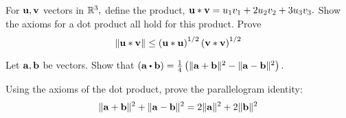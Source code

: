 \begin{enumialphparenastyle}
\begin{ex} For ${\bf u},{\bf v}$ vectors in $\mathbb{R}^{3},$ define the product, 
${\bf u}\ast {\bf v} =  u_{1}v_{1}+2u_{2}v_{2}+3u_{3}v_{3}.$ Show the axioms
for a dot product all hold for this product. Prove
\begin{equation*}
\| {\bf u}\ast {\bf v}\| \leq \left( {\bf u}\ast {\bf u}\right)
^{1/2}\left( {\bf v}\ast {\bf v}\right) ^{1/2}
\end{equation*}
\end{ex}


\begin{ex} Let ${\bf a},{\bf b}$ be vectors. Show that $\left( \vect{a}\dotprod \vect{b}\right) =\frac{1}{4}\left( \vectlength
\vect{a}+\vect{b}\vectlength ^{2}-\vectlength \vect{a}-\vect{b}\vectlength ^{2}\right) .$
\end{ex}

\begin{ex} Using the axioms of the dot product, prove the parallelogram identity: 
\begin{equation*}
\| {\bf a}+{\bf b}\| ^{2}+\| {\bf a}-{\bf b}\|
^{2}=2\| {\bf a}\| ^{2}+2\| {\bf b}
\| ^{2}
\end{equation*}
\end{ex}

\end{enumialphparenastyle}